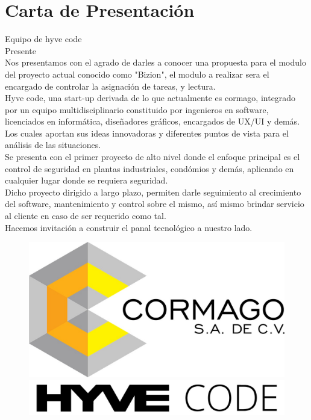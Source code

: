 \documentclass{report}
\begin{document}
	\tableofcontents
	\chapter{Carta de Presentación}
	Equipo de hyve code \\
	Presente\\
	\break
	Nos presentamos con el agrado de darles a conocer una propuesta para el modulo del proyecto actual conocido como "Bizion", el modulo a realizar sera el encargado
	de controlar la asignación de tareas, y lectura. \\
	
	Hyve code, una start-up derivada de lo que actualmente es cormago, integrado por un equipo multidisciplinario constituido por ingenieros en software, licenciados en informática, diseñadores gráficos, encargados de UX/UI y demás. Los cuales aportan sus ideas innovadoras y diferentes puntos de vista para el análisis de las situaciones.\\
	
	Se presenta con el primer proyecto de alto nivel donde el enfoque principal es el control de seguridad en plantas industriales, condómios y demás, aplicando en cualquier lugar donde se requiera seguridad.\\
	
	Dicho proyecto dirigido a largo plazo, permiten darle seguimiento al crecimiento del software, mantenimiento y control sobre el mismo, así mismo brindar servicio al cliente en caso de ser requerido como tal.\\
	
	Hacemos invitación a construir el panal tecnológico a nuestro lado.\\
	\begin{flushleft}
		\begin{figure}
		\includegraphics[width=0.5\linewidth]{comargo}
		\includegraphics[width=0.5\linewidth]{hyvecode}	
		\end{figure}
	\end{flushleft}		
	
\end{document}
